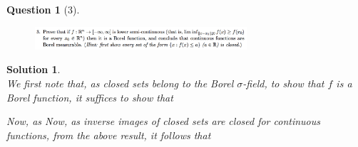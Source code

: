 \documentclass{article} %
\theoremstyle{quest}
\newtheorem*{question}{Question}
\newtheorem*{solution}{Solution}
\begin{document}
\newpage

\begin{question}[3]
\hfill
\begin{figure}[h!]
  \centering
    \includegraphics[width=0.7\textwidth]{problim-e1-p3.png}
\end{figure}
\end{question}
\begin{solution} \hfill \\
We first note that, as closed sets belong to 
the Borel $\sigma$-field, to show that $f$ is a Borel function, it suffices 
to show that 

\bigskip
Now, as 
Now, as inverse images of closed sets are closed for continuous functions, 
from the above result, it follows that  
\end{solution}

\newpage 
\end{document}
